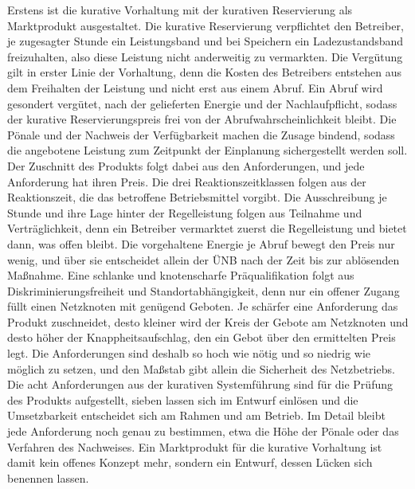 Erstens ist die kurative Vorhaltung mit der kurativen Reservierung als Marktprodukt ausgestaltet.
Die kurative Reservierung verpflichtet den Betreiber, je zugesagter Stunde ein Leistungsband und bei Speichern ein Ladezustandsband freizuhalten, also diese Leistung nicht anderweitig zu vermarkten.
Die Vergütung gilt in erster Linie der Vorhaltung, denn die Kosten des Betreibers entstehen aus dem Freihalten der Leistung und nicht erst aus einem Abruf.
Ein Abruf wird gesondert vergütet, nach der gelieferten Energie und der Nachlaufpflicht, sodass der kurative Reservierungspreis frei von der Abrufwahrscheinlichkeit bleibt.
Die Pönale und der Nachweis der Verfügbarkeit machen die Zusage bindend, sodass die angebotene Leistung zum Zeitpunkt der Einplanung sichergestellt werden soll.
Der Zuschnitt des Produkts folgt dabei aus den Anforderungen, und jede Anforderung hat ihren Preis.
Die drei Reaktionszeitklassen folgen aus der Reaktionszeit, die das betroffene Betriebsmittel vorgibt.
Die Ausschreibung je Stunde und ihre Lage hinter der Regelleistung folgen aus Teilnahme und Verträglichkeit, denn ein Betreiber vermarktet zuerst die Regelleistung und bietet dann, was offen bleibt.
Die vorgehaltene Energie je Abruf bewegt den Preis nur wenig, und über sie entscheidet allein der \ac{ÜNB} nach der Zeit bis zur ablösenden Maßnahme.
Eine schlanke und knotenscharfe Präqualifikation folgt aus Diskriminierungsfreiheit und Standortabhängigkeit, denn nur ein offener Zugang füllt einen Netzknoten mit genügend Geboten.
Je schärfer eine Anforderung das Produkt zuschneidet, desto kleiner wird der Kreis der Gebote am Netzknoten und desto höher der Knappheitsaufschlag, den ein Gebot über den ermittelten Preis legt.
Die Anforderungen sind deshalb so hoch wie nötig und so niedrig wie möglich zu setzen, und den Maßstab gibt allein die Sicherheit des Netzbetriebs.
Die acht Anforderungen aus der kurativen Systemführung sind für die Prüfung des Produkts aufgestellt, sieben lassen sich im Entwurf einlösen und die Umsetzbarkeit entscheidet sich am Rahmen und am Betrieb.
Im Detail bleibt jede Anforderung noch genau zu bestimmen, etwa die Höhe der Pönale oder das Verfahren des Nachweises.
Ein Marktprodukt für die kurative Vorhaltung ist damit kein offenes Konzept mehr, sondern ein Entwurf, dessen Lücken sich benennen lassen.

